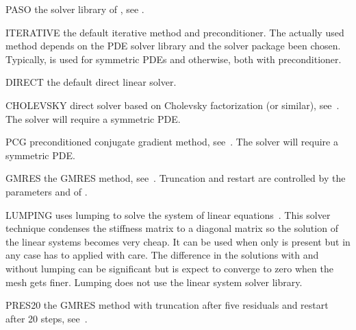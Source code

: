 \begin{memberdesc}[LinearPDE]{PASO}
the solver library of \finley, see .
\end{memberdesc}

\begin{memberdesc}[LinearPDE]{ITERATIVE}
the default iterative method and preconditioner. The actually used method depends on the
PDE solver library and the solver package been chosen. Typically, \PCG is used for symmetric PDEs
and \BiCGStab otherwise, both with \JACOBI preconditioner.
\end{memberdesc}

\begin{memberdesc}[LinearPDE]{DIRECT}
the default direct linear solver.
\end{memberdesc}

\begin{memberdesc}[LinearPDE]{CHOLEVSKY}
direct solver based on Cholevsky factorization (or similar), see~. The solver will require a symmetric PDE.
\end{memberdesc}

\begin{memberdesc}[LinearPDE]{PCG}
preconditioned conjugate gradient method, see~. The solver will require a symmetric PDE.
\end{memberdesc}

\begin{memberdesc}[LinearPDE]{GMRES}
the GMRES method, see~. Truncation and restart are controlled by the parameters
 and  of .
\end{memberdesc}

\begin{memberdesc}[LinearPDE]{LUMPING}
uses lumping to solve the system of linear equations~. This solver technique
condenses the stiffness matrix to a diagonal matrix so the solution of the linear systems becomes very cheap. It can be used when
only  is present but in any case has to applied with care. The difference in the solutions with and without lumping can be significant
but is expect to converge to zero when the mesh gets finer.
Lumping does not use the linear system solver library.
\end{memberdesc}

\begin{memberdesc}[LinearPDE]{PRES20}
the GMRES method with truncation after five residuals and
restart after 20 steps, see~.
\end{memberdesc}

